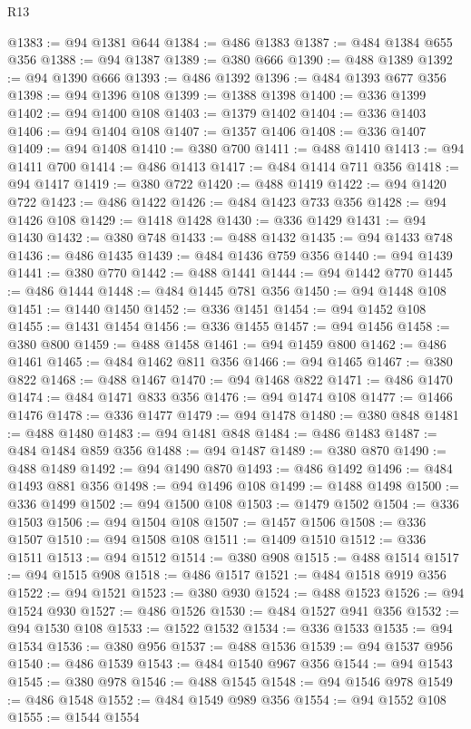 \begin{lexlean}{R13}
\begin{coremodule}
@1383 := @94 @1381 @644
@1384 := @486 @1383
@1387 := @484 @1384 @655 @356
@1388 := @94 @1387
@1389 := @380 @666
@1390 := @488 @1389
@1392 := @94 @1390 @666
@1393 := @486 @1392
@1396 := @484 @1393 @677 @356
@1398 := @94 @1396 @108
@1399 := @1388 @1398
@1400 := @336 @1399
@1402 := @94 @1400 @108
@1403 := @1379 @1402
@1404 := @336 @1403
@1406 := @94 @1404 @108
@1407 := @1357 @1406
@1408 := @336 @1407
@1409 := @94 @1408
@1410 := @380 @700
@1411 := @488 @1410
@1413 := @94 @1411 @700
@1414 := @486 @1413
@1417 := @484 @1414 @711 @356
@1418 := @94 @1417
@1419 := @380 @722
@1420 := @488 @1419
@1422 := @94 @1420 @722
@1423 := @486 @1422
@1426 := @484 @1423 @733 @356
@1428 := @94 @1426 @108
@1429 := @1418 @1428
@1430 := @336 @1429
@1431 := @94 @1430
@1432 := @380 @748
@1433 := @488 @1432
@1435 := @94 @1433 @748
@1436 := @486 @1435
@1439 := @484 @1436 @759 @356
@1440 := @94 @1439
@1441 := @380 @770
@1442 := @488 @1441
@1444 := @94 @1442 @770
@1445 := @486 @1444
@1448 := @484 @1445 @781 @356
@1450 := @94 @1448 @108
@1451 := @1440 @1450
@1452 := @336 @1451
@1454 := @94 @1452 @108
@1455 := @1431 @1454
@1456 := @336 @1455
@1457 := @94 @1456
@1458 := @380 @800
@1459 := @488 @1458
@1461 := @94 @1459 @800
@1462 := @486 @1461
@1465 := @484 @1462 @811 @356
@1466 := @94 @1465
@1467 := @380 @822
@1468 := @488 @1467
@1470 := @94 @1468 @822
@1471 := @486 @1470
@1474 := @484 @1471 @833 @356
@1476 := @94 @1474 @108
@1477 := @1466 @1476
@1478 := @336 @1477
@1479 := @94 @1478
@1480 := @380 @848
@1481 := @488 @1480
@1483 := @94 @1481 @848
@1484 := @486 @1483
@1487 := @484 @1484 @859 @356
@1488 := @94 @1487
@1489 := @380 @870
@1490 := @488 @1489
@1492 := @94 @1490 @870
@1493 := @486 @1492
@1496 := @484 @1493 @881 @356
@1498 := @94 @1496 @108
@1499 := @1488 @1498
@1500 := @336 @1499
@1502 := @94 @1500 @108
@1503 := @1479 @1502
@1504 := @336 @1503
@1506 := @94 @1504 @108
@1507 := @1457 @1506
@1508 := @336 @1507
@1510 := @94 @1508 @108
@1511 := @1409 @1510
@1512 := @336 @1511
@1513 := @94 @1512
@1514 := @380 @908
@1515 := @488 @1514
@1517 := @94 @1515 @908
@1518 := @486 @1517
@1521 := @484 @1518 @919 @356
@1522 := @94 @1521
@1523 := @380 @930
@1524 := @488 @1523
@1526 := @94 @1524 @930
@1527 := @486 @1526
@1530 := @484 @1527 @941 @356
@1532 := @94 @1530 @108
@1533 := @1522 @1532
@1534 := @336 @1533
@1535 := @94 @1534
@1536 := @380 @956
@1537 := @488 @1536
@1539 := @94 @1537 @956
@1540 := @486 @1539
@1543 := @484 @1540 @967 @356
@1544 := @94 @1543
@1545 := @380 @978
@1546 := @488 @1545
@1548 := @94 @1546 @978
@1549 := @486 @1548
@1552 := @484 @1549 @989 @356
@1554 := @94 @1552 @108
@1555 := @1544 @1554

\end{coremodule}
\end{lexlean}
